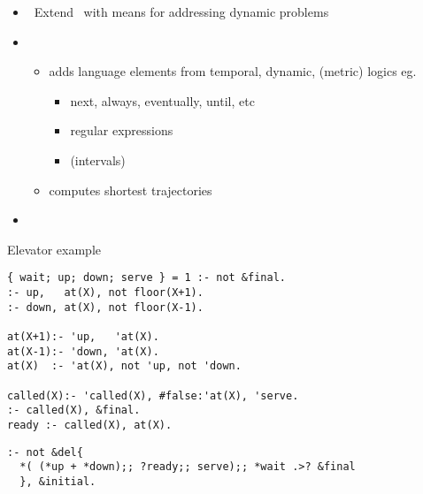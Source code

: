 \begin{frame}{\telingo}
  \begin{itemize}
  \item {} \ Extend \clingo\ with means for addressing dynamic problems
  \item {} \
    \begin{itemize}
    \item adds language elements from temporal, dynamic, (metric) logics
      eg.\
      \begin{itemize}
      \item next, always, eventually, until, etc
      \item regular expressions
      \item (intervals)
      \end{itemize}
    \item computes shortest trajectories
    \end{itemize}
  \item {} \ \cite{cakamosc19a,cadilasc20a}
  \end{itemize}
\end{frame}
\begin{frame}[fragile,shrink]{Elevator example}
\begin{lstlisting}[language=clingo,basicstyle=\small\ttfamily]
{ wait; up; down; serve } = 1 :- not &final.
:- up,   at(X), not floor(X+1).
:- down, at(X), not floor(X-1).

at(X+1):- 'up,   'at(X).
at(X-1):- 'down, 'at(X).
at(X)  :- 'at(X), not 'up, not 'down.

called(X):- 'called(X), #false:'at(X), 'serve.
:- called(X), &final.
ready :- called(X), at(X).
\end{lstlisting}
\pause
\begin{lstlisting}[language=clingo,basicstyle=\small\ttfamily]
:- not &del{
  *( (*up + *down);; ?ready;; serve);; *wait .>? &final
  }, &initial.
\end{lstlisting}
\end{frame}
%
